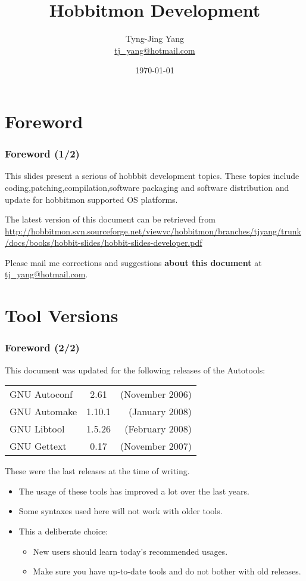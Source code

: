 \documentclass{beamer}
\title{Hobbitmon Development}
\author[T.J. Yang]{Tyng-Jing Yang \\\url{tj_yang@hotmail.com}}
\date{\today}
\begin{document}
\section*{Foreword}
\begin{frame}
\frametitle{Foreword (1/2)}

This slides present a serious of hobbbit development topics. These topics include coding,patching,compilation,software packaging and software distribution and update for hobbitmon supported OS platforms.

\bigskip

The latest version of this document can be retrieved from\\
{\small \url{http://hobbitmon.svn.sourceforge.net/viewvc/hobbitmon/branches/tjyang/trunk/docs/books/hobbit-slides/hobbit-slides-developer.pdf}}

\bigskip

Please mail me corrections and suggestions \textbf{about this
  document} at \url{tj_yang@hotmail.com}.

\end{frame}

\section*{Tool Versions}
\begin{frame}
\frametitle{Foreword (2/2)}

This document was updated for the following releases of the
Autotools:

\gdef\gettextver{0.17}
\gdef\automakever{1.10.1}
\gdef\autoconfver{2.61}
\begin{center}
\begin{tabular}{lcr}
GNU Autoconf & \autoconfver & (November 2006) \\
GNU Automake & \automakever & (January 2008) \\
GNU Libtool  & 1.5.26       & (February 2008) \\
GNU Gettext  & \gettextver  & (November 2007) \\
\end{tabular}
\end{center}

These were the last releases at the time of writing.

\begin{itemize}
\item The usage of these tools has improved a lot over
  the last years.
\item Some syntaxes used here will not work with older tools.
\item This a deliberate choice:
\begin{itemize}
\item New users should learn today's recommended usages.
\item Make sure you have up-to-date tools and do not bother with old releases.
\end{itemize}
\end{itemize}

\end{frame}
\end{document}
